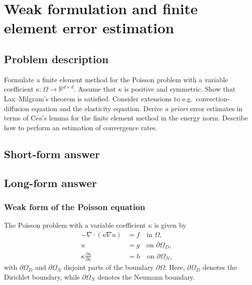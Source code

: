 \section{Weak formulation and finite element error estimation}
\subsection*{Problem description}
Formulate a finite element method for the Poisson problem with a variable coefficient $\kappa : \Omega \to \mathbb{R}^{d \times d}$.
Assume that $\kappa$ is positive and symmetric.
Show that Lax--Milgram's theorem is satisfied. %
Consider extensions to e.g.\ convection-diffusion equation and the elasticity equation.
Derive \textit{a priori} error estimates in terms of Cea's lemma for the finite element method in the energy norm.
Describe how to perform an estimation of convergence rates.

\subsection{Short-form answer}


\newpage
\subsection{Long-form answer}

\subsubsection{Weak form of the Poisson equation}
The Poisson problem with a variable coefficient $\kappa$ is given by
\begin{equation}
    \begin{split}
        -\nabla \cdot (\kappa \nabla u) &= f \quad \text{in } \Omega, \\
        u &= g \quad \text{on } \partial\Omega_D, \\
        \kappa \frac{\partial u}{\partial n} &= h \quad \text{on } \partial\Omega_N,
    \end{split}
\end{equation}
with $\partial\Omega_D$ and $\partial\Omega_N$ disjoint parts of the boundary $\partial\Omega$.
Here, $\partial\Omega_D$ denotes the Dirichlet boundary, while $\partial\Omega_N$ denotes the Neumann boundary.

